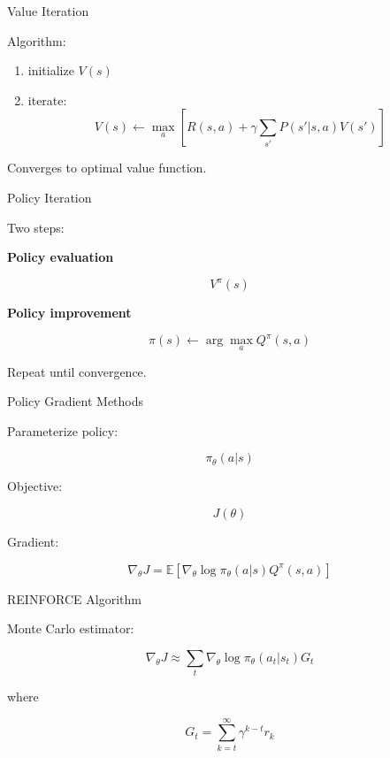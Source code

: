 \documentclass{beamer}
\begin{document}
\begin{frame}{Value Iteration}

  Algorithm:

  \begin{enumerate}
  \item initialize $V(s)$
  \item iterate:
    \[
    V(s) \leftarrow \max_a \left[
      R(s,a) + \gamma \sum_{s'} P(s'|s,a)V(s')
      \right]
    \]
  \end{enumerate}

  Converges to optimal value function.

\end{frame}

\begin{frame}{Policy Iteration}

  Two steps:

  \textbf{Policy evaluation}

  \[
  V^\pi(s)
  \]

  \textbf{Policy improvement}

  \[
  \pi(s) \leftarrow \arg\max_a Q^\pi(s,a)
  \]

  Repeat until convergence.

\end{frame}

\begin{frame}{Policy Gradient Methods}

  Parameterize policy:

  \[
  \pi_\theta(a|s)
  \]

  Objective:

  \[
  J(\theta)
  \]

  Gradient:

  \[
  \nabla_\theta J =
  \mathbb{E}\left[
    \nabla_\theta \log \pi_\theta(a|s) Q^\pi(s,a)
    \right]
  \]

\end{frame}

\begin{frame}{REINFORCE Algorithm}

  Monte Carlo estimator:

  \[
  \nabla_\theta J \approx
  \sum_t \nabla_\theta \log \pi_\theta(a_t|s_t) G_t
  \]

  where

  \[
  G_t = \sum_{k=t}^\infty \gamma^{k-t} r_k
  \]

\end{frame}
\end{document}
